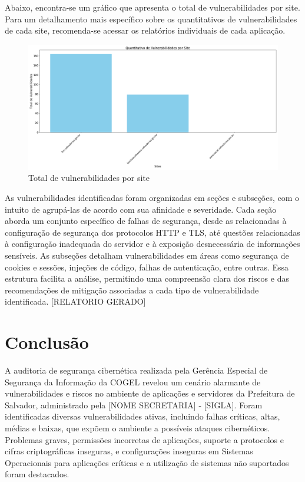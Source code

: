 \documentclass[a4paper,12pt]{article}
\begin{document}
Abaixo, encontra-se um gráfico que apresenta o total de vulnerabilidades por site.
Para um detalhamento mais específico sobre os quantitativos de vulnerabilidades de cada site, recomenda-se acessar os relatórios individuais de cada aplicação.
\begin{figure}[h!]
    \centering
    \includegraphics[width=1.0\textwidth]{images-was/vulnerabilidades-x-site.png} %
    \caption{Total de vulnerabilidades por site}
\end{figure}
\FloatBarrier
As vulnerabilidades identificadas foram organizadas em seções e subseções, com o intuito de agrupá-las de acordo com sua afinidade e severidade.
Cada seção aborda um conjunto específico de falhas de segurança, desde as relacionadas à configuração de segurança dos protocolos HTTP e TLS, até questões relacionadas à configuração inadequada do servidor e à exposição desnecessária de informações sensíveis.
As subseções detalham vulnerabilidades em áreas como segurança de cookies e sessões, injeções de código, falhas de autenticação, entre outras.
Essa estrutura facilita a análise, permitindo uma compreensão clara dos riscos e das recomendações de mitigação associadas a cada tipo de vulnerabilidade identificada.
[RELATORIO GERADO]
\newpage
\section{Conclusão}

A auditoria de segurança cibernética realizada pela Gerência Especial de Segurança da Informação da COGEL revelou um cenário alarmante de vulnerabilidades e riscos no ambiente de aplicações e servidores da Prefeitura de Salvador, administrado pela  [NOME SECRETARIA] - [SIGLA].
Foram identificadas diversas vulnerabilidades ativas, incluindo falhas críticas, altas, médias e baixas, que expõem o ambiente a possíveis ataques cibernéticos.
Problemas graves, permissões incorretas de aplicações, suporte a protocolos e cifras criptográficas inseguras, e configurações inseguras em Sistemas Operacionais para aplicações críticas e a utilização de sistemas não suportados foram destacados.\\
\end{document}
